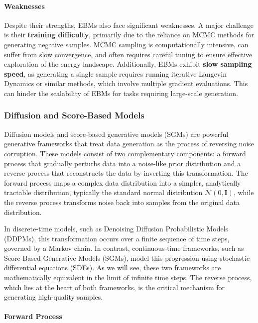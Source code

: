 \paragraph{Weaknesses}

Despite their strengths, EBMs also face significant weaknesses. A major challenge is their \textbf{training difficulty}, primarily due to the reliance on MCMC methods for generating negative samples. MCMC sampling is computationally intensive, can suffer from slow convergence, and often requires careful tuning to ensure effective exploration of the energy landscape. Additionally, EBMs exhibit \textbf{slow sampling speed}, as generating a single sample requires running iterative Langevin Dynamics or similar methods, which involve multiple gradient evaluations. This can hinder the scalability of EBMs for tasks requiring large-scale generation.


\subsubsection{Diffusion and Score-Based Models}

Diffusion models \cite{ho2020denoising} and score-based generative models (SGMs) \cite{song2021sde} are powerful generative frameworks that treat data generation as the process of reversing noise corruption. These models consist of two complementary components: a forward process that gradually perturbs data into a noise-like prior distribution and a reverse process that reconstructs the data by inverting this transformation. The forward process maps a complex data distribution into a simpler, analytically tractable distribution, typically the standard normal distribution \( \mathcal{N}(0, \mathbf{I}) \), while the reverse process transforms noise back into samples from the original data distribution.

In discrete-time models, such as Denoising Diffusion Probabilistic Models (DDPMs), this transformation occurs over a finite sequence of time steps, governed by a Markov chain. In contrast, continuous-time frameworks, such as Score-Based Generative Models (SGMs), model this progression using stochastic differential equations (SDEs). As we will see, these two frameworks are mathematically equivalent in the limit of infinite time steps. The reverse process, which lies at the heart of both frameworks, is the critical mechanism for generating high-quality samples.

\paragraph{Forward Process}


